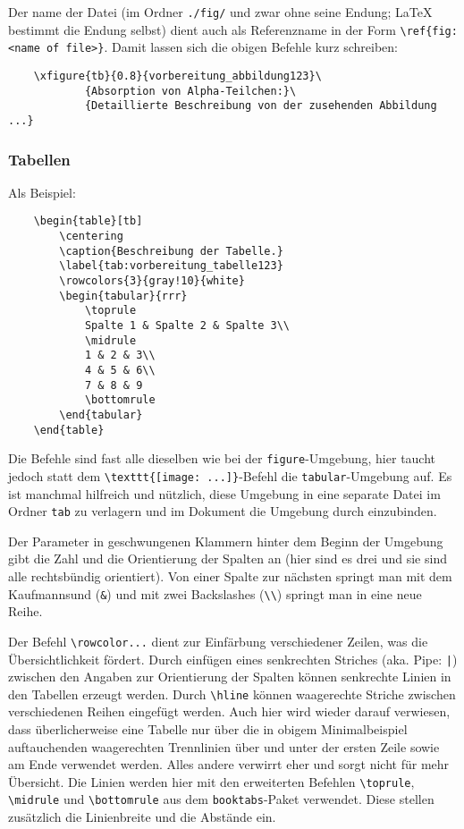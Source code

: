 Der name der Datei (im Ordner \verb|./fig/| und zwar ohne seine Endung; LaTeX bestimmt die Endung selbst) dient auch als Referenzname in der Form \verb|\ref{fig:<name of file>}|. Damit lassen sich die obigen Befehle kurz schreiben:

\begin{verbatim}
	\xfigure{tb}{0.8}{vorbereitung_abbildung123}\
	        {Absorption von Alpha-Teilchen:}\
	        {Detaillierte Beschreibung von der zusehenden Abbildung ...}
\end{verbatim}


\subsubsection{Tabellen}
Als Beispiel:
\begin{verbatim}
	\begin{table}[tb]
	    \centering
	    \caption{Beschreibung der Tabelle.}
	    \label{tab:vorbereitung_tabelle123}
	    \rowcolors{3}{gray!10}{white}
	    \begin{tabular}{rrr}
	        \toprule
	        Spalte 1 & Spalte 2 & Spalte 3\\
	        \midrule
	        1 & 2 & 3\\
	        4 & 5 & 6\\
	        7 & 8 & 9
	        \bottomrule
	    \end{tabular}
	\end{table}
\end{verbatim}

Die Befehle sind fast alle dieselben wie bei der \verb|figure|-Umgebung, hier taucht jedoch statt dem \verb|\texttt{[image: ...]}|-Befehl die \verb|tabular|-Umgebung auf. Es ist manchmal hilfreich und nützlich, diese Umgebung in eine separate Datei im Ordner \verb|tab| zu verlagern und im Dokument die Umgebung durch \verb|| einzubinden.

Der Parameter in geschwungenen Klammern hinter dem Beginn der Umgebung gibt die Zahl und die Orientierung der Spalten an (hier sind es drei und sie sind alle rechtsbündig orientiert). Von einer Spalte zur nächsten springt man mit dem Kaufmannsund (\verb|&|) und mit zwei Backslashes (\verb|\\|) springt man in eine neue Reihe.

Der Befehl \verb|\rowcolor...| dient zur Einfärbung verschiedener Zeilen, was die Übersichtlichkeit fördert. Durch einfügen eines senkrechten Striches (aka. Pipe: \verb&|&) zwischen den Angaben zur Orientierung der Spalten können senkrechte Linien in den Tabellen erzeugt werden. Durch \verb|\hline| können waagerechte Striche zwischen verschiedenen Reihen eingefügt werden. Auch hier wird wieder darauf verwiesen, dass überlicherweise eine Tabelle nur über die in obigem Minimalbeispiel auftauchenden waagerechten Trennlinien über und unter der ersten Zeile sowie am Ende verwendet werden.  Alles andere verwirrt eher und sorgt nicht für mehr Übersicht. Die Linien werden hier mit den erweiterten Befehlen \verb|\toprule|, \verb|\midrule| und \verb|\bottomrule| aus dem \verb|booktabs|-Paket verwendet. Diese stellen zusätzlich die Linienbreite und die Abstände ein.

